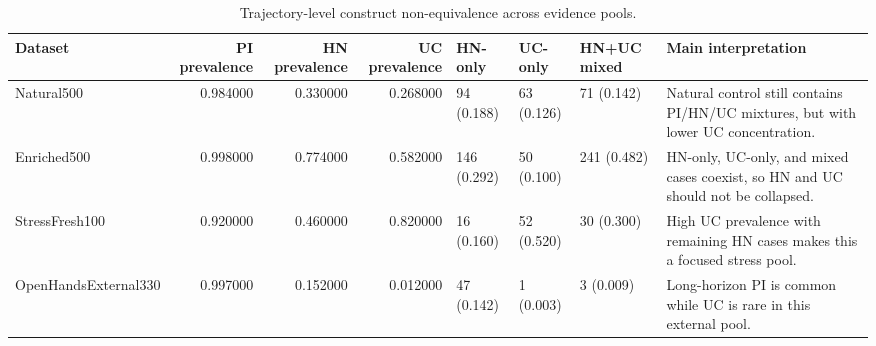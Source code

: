 \begin{table}
\caption{Trajectory-level construct non-equivalence across evidence pools.}
\label{tab:table2_construct_non_equivalence}
\begin{tabular}{lrrrllll}
\toprule
Dataset & PI prevalence & HN prevalence & UC prevalence & HN-only & UC-only & HN+UC mixed & Main interpretation \\
\midrule
Natural500 & 0.984000 & 0.330000 & 0.268000 & 94 (0.188) & 63 (0.126) & 71 (0.142) & Natural control still contains PI/HN/UC mixtures, but with lower UC concentration. \\
Enriched500 & 0.998000 & 0.774000 & 0.582000 & 146 (0.292) & 50 (0.100) & 241 (0.482) & HN-only, UC-only, and mixed cases coexist, so HN and UC should not be collapsed. \\
StressFresh100 & 0.920000 & 0.460000 & 0.820000 & 16 (0.160) & 52 (0.520) & 30 (0.300) & High UC prevalence with remaining HN cases makes this a focused stress pool. \\
OpenHandsExternal330 & 0.997000 & 0.152000 & 0.012000 & 47 (0.142) & 1 (0.003) & 3 (0.009) & Long-horizon PI is common while UC is rare in this external pool. \\
\bottomrule
\end{tabular}
\end{table}

